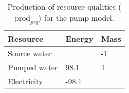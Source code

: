 \begin{table}[h]
	\centering
	\caption{Production of resource qualities ($\mbox{prod}_{prq}$) for the pump model.} \label{tab:pump_resource_quality}
	\begin{tabular}{lll}
		\toprule
		Resource  & Energy & Mass \\
		\midrule
		Source water &  & -1 \\
		Pumped water & 98.1 & 1 \\
		Electricity & -98.1 & \\
		\bottomrule
	\end{tabular}
\end{table}

